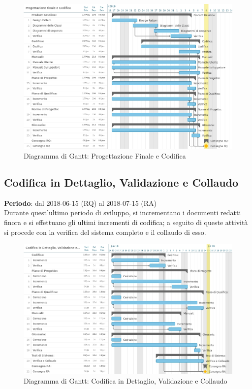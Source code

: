 \begin{figure}
	\centerline{\includegraphics[scale=0.5]{img/DiagrammiGantt/ProgettazioneFinaleCodifica.jpg}}
	\caption{Diagramma di Gantt: Progettazione Finale e Codifica}
\end{figure}
\clearpage

\subsection{Codifica in Dettaglio, Validazione e Collaudo}
\textbf{Periodo}: dal 2018-06-15 (RQ) al 2018-07-15 (RA)\\

Durante quest'ultimo periodo di sviluppo, si incrementano i documenti redatti finora e si effettuano gli ultimi incrementi di codifica; a seguito di queste attività si procede con la verifica del sistema completo e il collaudo di esso.

\begin{figure}
	\centerline{\includegraphics[scale=0.5]{img/DiagrammiGantt/CodificaValidazioneCollaudo.jpg}}
	\caption{Diagramma di Gantt: Codifica in Dettaglio, Validazione e Collaudo}
\end{figure}
\clearpage

